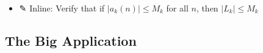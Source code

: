 \documentclass[
  10pt,
  letterpaper,
]{scrbook}
\providecommand{\tightlist}{%
  \setlength{\itemsep}{0pt}\setlength{\parskip}{0pt}}
\begin{document}
\begin{itemize}
  \begin{itemize}
  \tightlist
  \item
    We would need \(|a_k(n)| \leq M_k\) for all \(n\)
  \item
    But \(a_k(n) = 1/n\) for \(k \leq n\), so we'd need \(M_k \geq 1/n\)
    for all \(n \geq k\)
  \item
    This means \(M_k \geq \sup_{n \geq k} 1/n\)\ldots{} but wait, the
    sup over all \(n\) is taken at \(n = k\), giving \(M_k \geq 1/k\)
  \item
    Then \(\sum M_k \geq \sum 1/k = \infty\) --- condition 3 fails
  \end{itemize}
\item
  ✎ Inline: Verify that if \(|a_k(n)| \leq M_k\) for all \(n\), then
  \(|L_k| \leq M_k\)
\end{itemize}

\subsection{The Big Application}\label{the-big-application}
\end{document}
